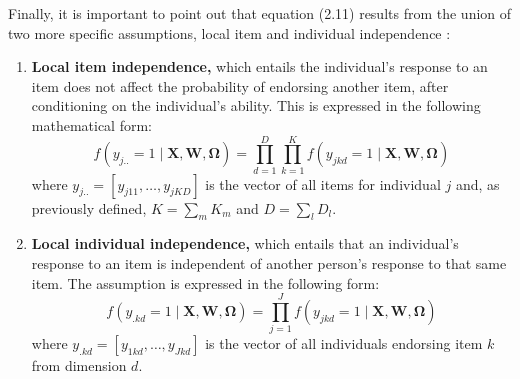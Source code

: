 \begin{enumerate}
	Finally, it is important to point out that equation (2.11)
	results from the union of two more specific assumptions, local item and individual independence \cite{Reckase_2009, Baker_2001, Hambleton_et_al_1991a}:
	\begin{enumerate}
		\item \textbf{Local item independence,} which entails the individual's response to an item does not affect the probability of endorsing another item, after conditioning on the individual's ability. This is expressed in the following mathematical form:
		\begin{equation}
			f \left( y_{j..}=1 \; | \; \mathbf{X}, \mathbf{W}, \pmb{\Omega} \right) = \prod_{d=1}^{D} \prod_{k=1}^{K} f \left( y_{jkd}=1 \; | \; \mathbf{X}, \mathbf{W}, \pmb{\Omega} \right)
		\end{equation}
		where $y_{j..} = [ y_{j11}, \dots, y_{jKD}]$ is the vector of all items for individual $j$ and, as previously defined, $K = \sum_{m} K_{m}$ and $D = \sum_{l} D_{l}$. \\
		\item \textbf{Local individual independence,} which entails that an individual's response to an item is independent of another person's response to that same item. The assumption is expressed in the following form:
		\begin{equation}
			f \left( y_{.kd}=1 \; | \; \mathbf{X}, \mathbf{W}, \pmb{\Omega} \right) = \prod_{j=1}^{J} f \left( y_{jkd}=1 \; | \; \mathbf{X}, \mathbf{W}, \pmb{\Omega} \right)
		\end{equation}
		where $y_{.kd} = [ y_{1kd}, \dots, y_{Jkd}]$ is the vector of all individuals endorsing item $k$ from dimension $d$.
	\end{enumerate}
\end{enumerate}

